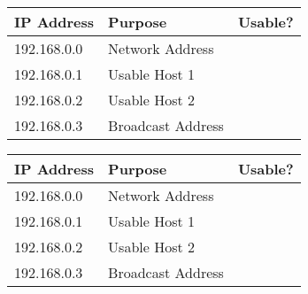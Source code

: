 \documentclass[preview, border=1pt, varwidth]{standalone}
\newcommand{\bwCmark}{\ding{51}}  %
\newcommand{\bwXmark}{\ding{55}}  %
\newcommand{\cmark}{\textcolor{green}{\ding{51}}}  %
\newcommand{\xmark}{\textcolor{red}{\ding{55}}}    %
\begin{document}
\begin{tabular}{| l | l | c |}
    \hline
    \textbf{IP Address}  & \textbf{Purpose}  & \textbf{Usable?} \\ 
    \hline
    192.168.0.0  & Network Address      & \bwXmark \\ 
    192.168.0.1  & Usable Host 1      & \bwCmark \\ 
    192.168.0.2  & Usable Host 2      & \bwCmark \\ 
    192.168.0.3  & Broadcast Address  & \bwXmark \\ 
    \hline
\end{tabular}

\vspace{1cm} %

\begin{tabular}{| l | l | c |}
    \hline
    \textbf{IP Address}  & \textbf{Purpose}  & \textbf{Usable?} \\ 
    \hline
    192.168.0.0  & Network Address      & \xmark \\ 
    192.168.0.1  & Usable Host 1      & \cmark \\ 
    192.168.0.2  & Usable Host 2      & \cmark \\ 
    192.168.0.3  & Broadcast Address  & \xmark \\ 
    \hline
\end{tabular}
\end{document}
